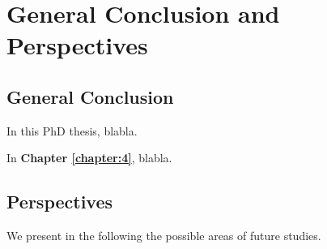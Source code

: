 
\chapter{General Conclusion and Perspectives}
\label{chapter:conclusion}
\graphicspath{{2-Chapters/6-Chapter/Images/}}

\section{General Conclusion}
In this PhD thesis, blabla.

In \textbf{Chapter \ref{chapter:4}}, blabla.


\section{Perspectives}
We present in the following the possible areas of future studies.
